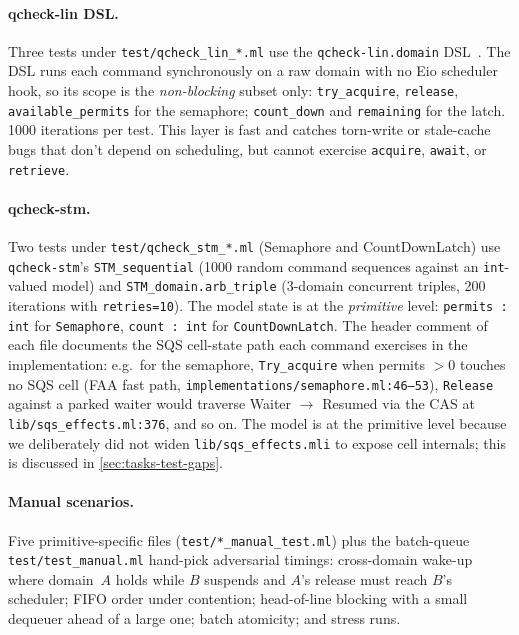 \documentclass[11pt,a4paper]{article}
\begin{document}
\paragraph{qcheck-lin DSL.}
Three tests under \texttt{test/qcheck\_lin\_*.ml} use the
\texttt{qcheck-lin.domain} DSL~\cite{qcheck}. The DSL runs each
command synchronously on a raw domain with no Eio scheduler hook, so
its scope is the \emph{non-blocking} subset only:
\texttt{try\_acquire}, \texttt{release}, \texttt{available\_permits}
for the semaphore; \texttt{count\_down} and \texttt{remaining} for
the latch. 1000 iterations per test. This layer is fast and catches
torn-write or stale-cache bugs that don't depend on scheduling, but
cannot exercise \texttt{acquire}, \texttt{await}, or
\texttt{retrieve}.

\paragraph{qcheck-stm.}
Two tests under \texttt{test/qcheck\_stm\_*.ml} (Semaphore and
CountDownLatch) use \texttt{qcheck-stm}'s \texttt{STM\_sequential}
(1000 random command sequences against an \texttt{int}-valued model)
and
\texttt{STM\_domain.arb\_triple} (3-domain concurrent triples, 200
iterations with \texttt{retries=10}). The model state is at the
\emph{primitive} level: \texttt{permits : int} for
\texttt{Semaphore}, \texttt{count : int} for \texttt{CountDownLatch}.
The header comment of each file documents the SQS cell-state path
each command exercises in the implementation: e.g.\ for the
semaphore, \texttt{Try\_acquire} when permits $>0$ touches no SQS
cell (FAA fast path,
\texttt{implementations/semaphore.ml:46--53}), \texttt{Release}
against a parked waiter would traverse Waiter $\to$ Resumed via the
CAS at \texttt{lib/sqs\_effects.ml:376}, and so on. The model is at
the primitive level because we deliberately did not widen
\texttt{lib/sqs\_effects.mli} to expose cell internals; this is
discussed in \cref{sec:tasks-test-gaps}.

\paragraph{Manual scenarios.}
Five primitive-specific files (\texttt{test/*\_manual\_test.ml}) plus
the batch-queue \texttt{test/test\_manual.ml} hand-pick adversarial
timings: cross-domain wake-up where domain~$A$ holds while $B$
suspends and $A$'s release must reach $B$'s scheduler; FIFO order
under contention; head-of-line blocking with a small dequeuer ahead
of a large one; batch atomicity; and stress runs.
\end{document}
